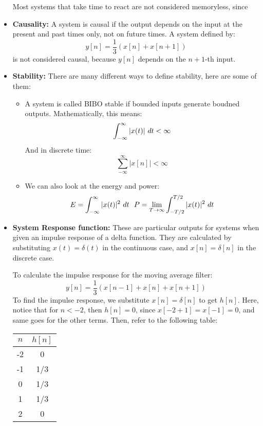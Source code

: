 \begin{itemize}
		 Most systems that take time to react are not considered memoryless, since 
	 \item \textbf{Causality:} A system is causal if the output depends on the input at the present and past times 
		 only, not on future times. A system defined by:
		 \[
			 y[n] = \frac{1}{3} (x[n] + x[n + 1])
		 \] 
		 is not considered causal, because \( y[n] \) depends on the \( n + 1 \)-th input. 
	 \item \textbf{Stability:} There are many different ways to define stability, here are some of them:
		 \begin{itemize}
		 	\item A system is called BIBO stable if bounded inputs generate boudned 
		 outputs. Mathematically, this means:
		 \[
		 \int_{-\infty}^{\infty} |x(t)|\ d t  < \infty
		 \] 
		 And in discrete time:
		 \[
		 \sum_{-\infty}^\infty |x[n]| < \infty
		 \] 
	 \item We can also look at the energy and power:
		 \[
		 E = \int_{-\infty}^{\infty} |x(t)|^2 \diff t  \ \ P = \lim_{T \to \infty } \int_{-T / 2}^{T / 2} |x(t)|^2 
		 \diff t
		 \] 
		 \end{itemize} 
	 \item \textbf{System Response function:} These are particular outputs for systems when given an impulse 
		 response of a delta function. They are calculated by substituting \( x(t) = \delta(t)  \) in the 
		 continuous case, and \( x[n] = \delta[n] \) in the discrete case. 

		 To calculate the impulse response for the moving average filter:
		 \[
			 y[n] = \frac{1}{3}(x[n -1] + x[n] + x[n + 1])
		 \] 
		 To find the impulse response, we substitute \( x[n] = \delta[n] \) to get \( h[n] \). Here, notice that 
		 for \( n < -2 \), then \( h[n] = 0 \), since \( x[-2 + 1] = x[-1] = 0 \), and same goes for the other terms. 
		 Then, refer to the following table:
		 \begin{center}
			 \begin{tabular}{c|c}
				 \( n \) & \( h[n] \) \\
				 \hline 
				 -2 & 0 \\
				 -1 & 1/3\\
				 0 & 1/3\\
				 1 & 1/3\\
				 2 & 0
		 	\end{tabular}
		 \end{center}
\end{itemize}
